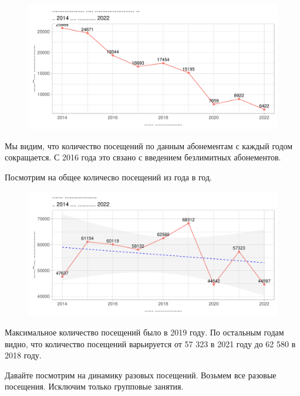 \documentclass[
  letterpaper,
  DIV=11,
  numbers=noendperiod]{scrreprt}
\begin{document}
\begin{figure}

{\centering \includegraphics{./intro_files/figure-pdf/unnamed-chunk-10-1.pdf}

}

\end{figure}

Мы видим, что количество посещений по данным абонементам с каждый годом
сокращается. С 2016 года это свзано с введением безлимитных абонементов.

Посмотрим на общее количесво посещений из года в год.

\begin{figure}

{\centering \includegraphics{./intro_files/figure-pdf/unnamed-chunk-11-1.pdf}

}

\end{figure}

Максимальное количество посещений было в 2019 году. По остальным годам
видно, что количество посещений варьируется от 57 323 в 2021 году до 62
580 в 2018 году.

Давайте посмотрим на динамику разовых посещений. Возьмем все разовые
посещения. Исключим только групповые занятия.
\end{document}
